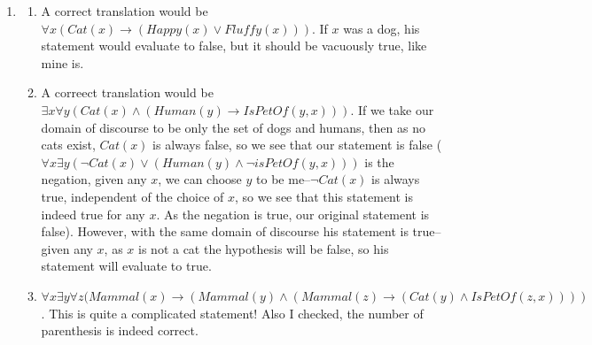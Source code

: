 \documentclass[12pt]{article}
\theoremstyle{definition}
\theoremstyle{remark}
\newcommand{\ra}{\rightarrow}
\begin{document}
\begin{enumerate}[leftmargin=\labelsep]
		\newpage
		\item 
		\begin{enumerate}
			\item A correct translation would be $\forall x (Cat(x) \ra (Happy(x) \lor Fluffy(x)))$. If $x$ was a dog, his statement would evaluate to false, but it should be vacuously true, like mine is.
			\item A correect translation would be $\exists x \forall y (Cat(x) \land (Human(y) \ra IsPetOf(y, x)))$. If we take our domain of discourse to be only the set of dogs and humans, then as no cats exist, $Cat(x)$ is always false, so we see that our statement is false ($\forall x \exists y (\lnot Cat(x) \lor (Human(y) \land \lnot isPetOf(y, x)))$ is the negation, given any $x$, we can choose $y$ to be me--$\lnot Cat(x)$ is always true, independent of the choice of $x$, so we see that this statement is indeed true for any $x$. As the negation is true, our original statement is false). However, with the same domain of discourse his statement is true--given any $x$, as $x$ is not a cat the hypothesis will be false, so his statement will evaluate to true.
			\item 
			$\forall x \exists y \forall z (Mammal(x) \ra (Mammal(y) \land (Mammal(z) \ra (Cat(y) \land IsPetOf(z, x))))$. This is quite a complicated statement! Also I checked, the number of parenthesis is indeed correct.
		\end{enumerate}
	

\end{enumerate}
\end{document}
